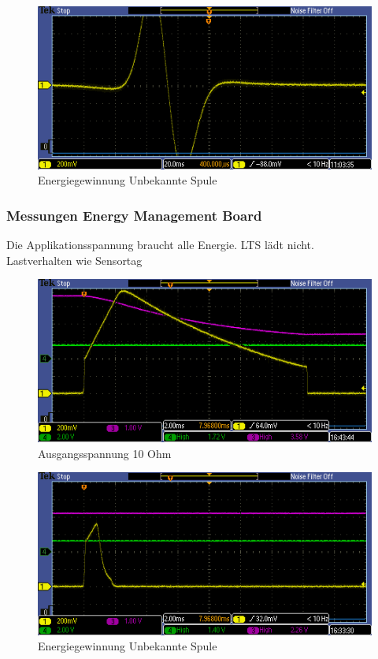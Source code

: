 \begin{figure}[h]
\includegraphics[bb=0 150 50 50]{UnbekannteSpule.PNG}
\caption{Energiegewinnung Unbekannte Spule}
\end{figure}

\pagebreak 
\subsubsection{Messungen Energy Management Board}
Die Applikationsspannung braucht alle Energie. LTS lädt nicht. 
\\

Lastverhalten wie Sensortag

\begin{figure}[h]
\includegraphics[bb=0 100 50 50]{EMBoardAusgang10Ohm.PNG}
\caption{Ausgangsspannung 10 Ohm}
\end{figure}

\begin{figure}[h]
\includegraphics[bb=0 150 50 50]{EMBoardAusgang100Ohm.PNG}
\caption{Energiegewinnung Unbekannte Spule}
\end{figure}



